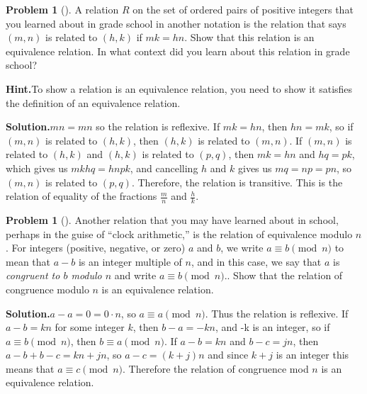 \documentclass[10pt,]{book}
\theoremstyle{plain}
\theoremstyle{definition}
\newtheorem{activity}[project]{Problem}
\theoremstyle{definition}
\numberwithin{equation}{chapter}
\begin{document}
\begin{activity}[]\label{activity-349}
A relation \(R\) on the set of ordered pairs of positive integers that you learned about in grade school in another notation is the relation that says \((m,n)\) is related to \((h,k)\) if \(mk =hn\). Show that this relation is an equivalence relation. In what context did you learn about this relation in grade school?%
\par\medskip\noindent%
\textbf{Hint.}\quad To show a relation is an equivalence relation, you need to show it satisfies the definition of an equivalence relation.%
\par\medskip\noindent%
\textbf{Solution.}\quad \(mn=mn\) so the relation is reflexive. If \(mk=hn\), then \(hn=mk\), so if \((m,n)\) is related to \((h,k)\), then \((h,k)\) is related to \((m,n)\). If \((m,n)\) is related to \((h,k)\) and \((h,k)\) is related to \((p,q)\), then \(mk=hn\) and \(hq=pk\), which gives us \(mkhq=hnpk\), and cancelling \(h\) and \(k\) gives us \(mq=np=pn\), so \((m,n)\) is related to \((p,q)\). Therefore, the relation is transitive. This is the relation of equality of the fractions \(\frac{m}{n}\) and \(\frac{h}{k}\).%
\end{activity}
\begin{activity}[]\label{activity-350}
Another relation that you may have learned about in school, perhaps in the guise of ``clock arithmetic,'' is the relation of equivalence modulo \(n\). For integers (positive, negative, or zero) \(a\) and \(b\), we write \(a
\equiv b \pmod{n}\) to mean that \(a-b\) is an integer multiple of \(n\), and in this case, we say that \(a\) is \emph{congruent to \(b\) modulo \(n\)} and write \(a\equiv b \pmod{n}\).. Show that the relation of congruence modulo \(n\) is an equivalence relation.%
\par\medskip\noindent%
\textbf{Solution.}\quad \(a-a=0=0\cdot n\), so \(a\equiv a\pmod{n}\). Thus the relation is reflexive. If \(a-b=kn\) for some integer \(k\), then \(b-a=-kn\), and -k is an integer, so if \(a\equiv b \pmod{n}\), then \(b\equiv a \pmod{n}\). If \(a-b=kn\) and \(b-c= jn\), then \(a-b+b-c=kn+jn\), so \(a-c=(k+j)n\) and since \(k+j\) is an integer this means that \(a\equiv c\pmod{n}\). Therefore the relation of congruence mod \(n\) is an equivalence relation.%
\end{activity}
\end{document}
